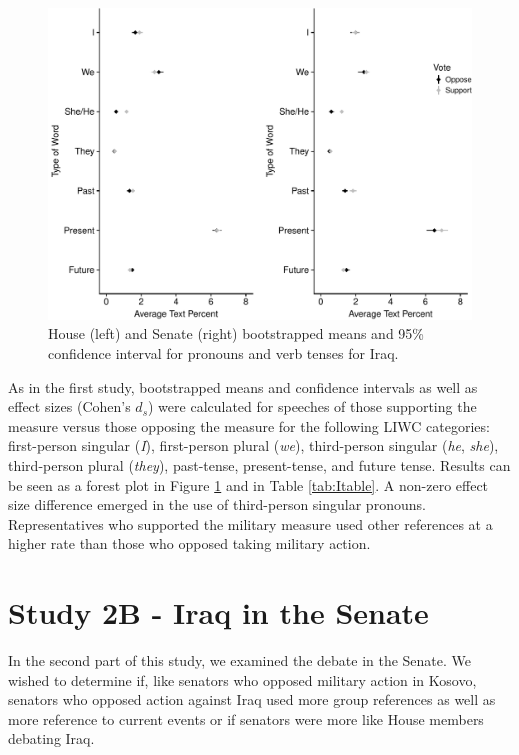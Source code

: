 \documentclass[english,man]{apa6}
\theoremstyle{definition}
\theoremstyle{definition}
\theoremstyle{definition}
\theoremstyle{remark}
\begin{document}
\begin{figure}
\centering
\includegraphics{Language_of_War_Markdown_files/figure-latex/Ipic-1.pdf}
\caption{\label{fig:Ipic}House (left) and Senate (right) bootstrapped means
and 95\% confidence interval for pronouns and verb tenses for Iraq.}
\end{figure}

As in the first study, bootstrapped means and confidence intervals as
well as effect sizes (Cohen's \(d_s\)) were calculated for speeches of
those supporting the measure versus those opposing the measure for the
following LIWC categories: first-person singular (\emph{I}),
first-person plural (\emph{we}), third-person singular (\emph{he},
\emph{she}), third-person plural (\emph{they}), past-tense,
present-tense, and future tense. Results can be seen as a forest plot in
Figure \ref{fig:Ipic} and in Table \ref{tab:Itable}. A non-zero effect
size difference emerged in the use of third-person singular pronouns.
Representatives who supported the military measure used other references
at a higher rate than those who opposed taking military action.

\section{Study 2B - Iraq in the
Senate}\label{study-2b---iraq-in-the-senate}

In the second part of this study, we examined the debate in the Senate.
We wished to determine if, like senators who opposed military action in
Kosovo, senators who opposed action against Iraq used more group
references as well as more reference to current events or if senators
were more like House members debating Iraq.
\end{document}
